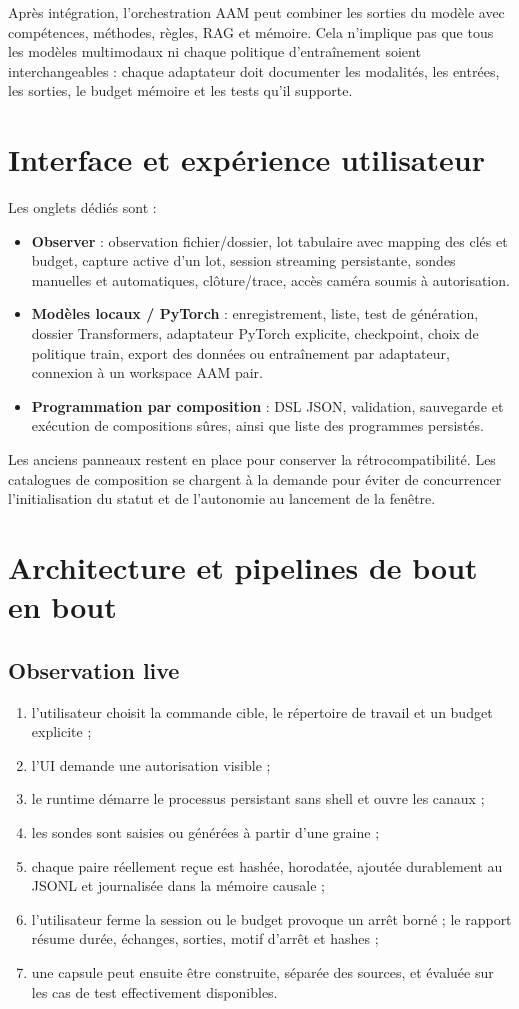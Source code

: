 \documentclass[11pt,a4paper]{article}
\begin{document}
Après intégration, l'orchestration AAM peut combiner les sorties du modèle avec compétences, méthodes, règles, RAG et mémoire. Cela n'implique pas que tous les modèles multimodaux ni chaque politique d'entraînement soient interchangeables : chaque adaptateur doit documenter les modalités, les entrées, les sorties, le budget mémoire et les tests qu'il supporte.

\section{Interface et expérience utilisateur}
Les onglets dédiés sont :
\begin{itemize}[leftmargin=1.5em]
  \item \textbf{Observer} : observation fichier/dossier, lot tabulaire avec mapping des clés et budget, capture active d'un lot, session streaming persistante, sondes manuelles et automatiques, clôture/trace, accès caméra soumis à autorisation.
  \item \textbf{Modèles locaux / PyTorch} : enregistrement, liste, test de génération, dossier Transformers, adaptateur PyTorch explicite, checkpoint, choix de politique train, export des données ou entraînement par adaptateur, connexion à un workspace AAM pair.
  \item \textbf{Programmation par composition} : DSL JSON, validation, sauvegarde et exécution de compositions sûres, ainsi que liste des programmes persistés.
\end{itemize}
Les anciens panneaux restent en place pour conserver la rétrocompatibilité. Les catalogues de composition se chargent à la demande pour éviter de concurrencer l'initialisation du statut et de l'autonomie au lancement de la fenêtre.

\section{Architecture et pipelines de bout en bout}
\subsection{Observation live}
\begin{enumerate}[leftmargin=1.5em]
  \item l'utilisateur choisit la commande cible, le répertoire de travail et un budget explicite ;
  \item l'UI demande une autorisation visible ;
  \item le runtime démarre le processus persistant sans shell et ouvre les canaux ;
  \item les sondes sont saisies ou générées à partir d'une graine ;
  \item chaque paire réellement reçue est hashée, horodatée, ajoutée durablement au JSONL et journalisée dans la mémoire causale ;
  \item l'utilisateur ferme la session ou le budget provoque un arrêt borné ; le rapport résume durée, échanges, sorties, motif d'arrêt et hashes ;
  \item une capsule peut ensuite être construite, séparée des sources, et évaluée sur les cas de test effectivement disponibles.
\end{enumerate}
\end{document}
